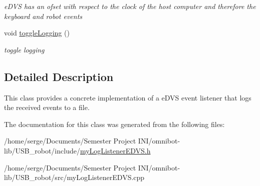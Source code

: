 \begin{DoxyCompactItemize}
\begin{DoxyCompactList}\small\item\em e\+D\+V\+S has an ofset with respect to the clock of the host computer and therefore the keyboard and robot events \end{DoxyCompactList}\item 
\hypertarget{classmy_log_listener_e_d_v_s_aca2a9088907f9b0ab265aa4d3cd32ba4}{}void \hyperlink{classmy_log_listener_e_d_v_s_aca2a9088907f9b0ab265aa4d3cd32ba4}{toggle\+Logging} ()\label{classmy_log_listener_e_d_v_s_aca2a9088907f9b0ab265aa4d3cd32ba4}

\begin{DoxyCompactList}\small\item\em toggle logging \end{DoxyCompactList}\end{DoxyCompactItemize}


\subsection{Detailed Description}
This class provides a concrete implementation of a e\+D\+V\+S event listener that logs the received events to a file. 

The documentation for this class was generated from the following files\+:\begin{DoxyCompactItemize}
\item 
/home/serge/\+Documents/\+Semester Project I\+N\+I/omnibot-\/lib/\+U\+S\+B\+\_\+robot/include/\hyperlink{my_log_listener_e_d_v_s_8h}{my\+Log\+Listener\+E\+D\+V\+S.\+h}\item 
/home/serge/\+Documents/\+Semester Project I\+N\+I/omnibot-\/lib/\+U\+S\+B\+\_\+robot/src/my\+Log\+Listener\+E\+D\+V\+S.\+cpp\end{DoxyCompactItemize}
